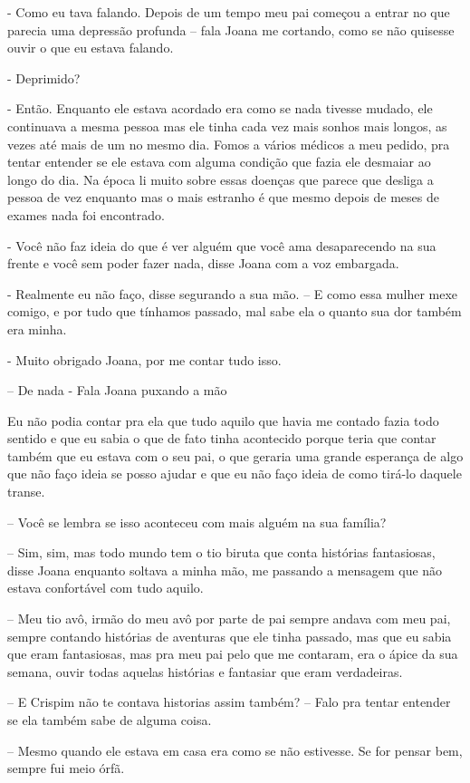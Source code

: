 - Como eu tava falando. Depois de um tempo meu pai começou a entrar no que parecia uma depressão profunda -- fala Joana me cortando, como se não quisesse ouvir o que eu estava falando.

- Deprimido?

- Então. Enquanto ele estava acordado era como se nada tivesse mudado, ele continuava a mesma pessoa mas ele tinha cada vez mais sonhos mais longos, as vezes até mais de um no mesmo dia. Fomos a vários médicos a meu pedido, pra tentar entender se ele estava com alguma condição que fazia ele desmaiar ao longo do dia. Na época li muito sobre essas doenças que parece que desliga a pessoa de vez enquanto mas o mais estranho é que mesmo depois de meses de exames nada foi encontrado.

- Você não faz ideia do que é ver alguém que você ama desaparecendo na sua frente e você sem poder fazer nada, disse Joana com a voz embargada.

- Realmente eu não faço, disse segurando a sua mão. -- E como essa mulher mexe comigo, e por tudo que tínhamos passado, mal sabe ela o quanto sua dor também era minha.

- Muito obrigado Joana, por me contar tudo isso.

-- De nada - Fala Joana puxando a mão

Eu não podia contar pra ela que tudo aquilo que havia me contado fazia todo sentido e que eu sabia o que de fato tinha acontecido porque teria que contar também que eu estava com o seu pai, o que geraria uma grande esperança de algo que não faço ideia se posso ajudar e que eu não faço ideia de como tirá-lo daquele transe.

-- Você se lembra se isso aconteceu com mais alguém na sua família?

-- Sim, sim, mas todo mundo tem o tio biruta que conta histórias fantasiosas, disse Joana enquanto soltava a minha mão, me passando a mensagem que não estava confortável com tudo aquilo.

-- Meu tio avô, irmão do meu avô por parte de pai sempre andava com meu pai, sempre contando histórias de aventuras que ele tinha passado, mas que eu sabia que eram fantasiosas, mas pra meu pai pelo que me contaram, era o ápice da sua semana, ouvir todas aquelas histórias e fantasiar que eram verdadeiras.

-- E Crispim não te contava historias assim também? -- Falo pra tentar entender se ela também sabe de alguma coisa.

-- Mesmo quando ele estava em casa era como se não estivesse. Se for pensar bem, sempre fui meio órfã.

